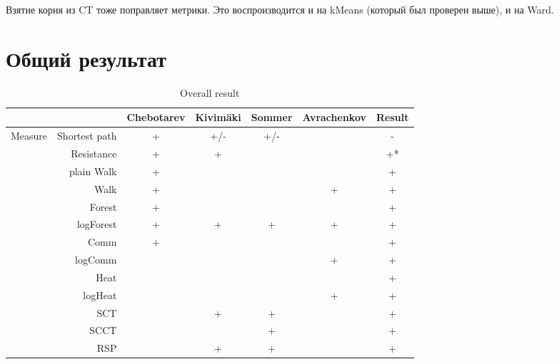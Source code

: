 \documentclass{article}
\begin{document}
Взятие корня из CT тоже поправляет метрики. Это воспроизводится и на kMeans (который был проверен выше), и на Ward.


\section*{Общий результат}

\begin{table}[H]
\centering
\caption{Overall result}
\label{my-label}
\begin{tabular}{rr|cccc|c}
                &                          & Chebotarev & Kivim{\"a}ki & Sommer & Avrachenkov & Result \\
                \hline
\multirow{18}{*}{Measure} & Shortest path  & +          & \cellcolor{red!25} +/- & \cellcolor{red!25} +/- & & \cellcolor{red!25} - \\
                & Resistance               & +          & +        &        &             &  \cellcolor{yellow!25} +* \\
                & plain Walk               & +          &          &        &             & +      \\
                & Walk                     & +          &          &        & +           & +      \\
                & Forest                   & +          &          &        &             & +      \\
                & logForest                & +          & +        & +      & +           & +      \\
                & Comm                     & +          &          &        &             & +      \\
                & logComm                  &            &          &        & +           & +      \\
                & Heat                     &            &          &        &             & \cellcolor{yellow!25} + \\
                & logHeat                  &            &          &        & +           & +      \\
                & SCT                      &            & +        & +      &             & +      \\
                & SCCT                     &            &          & +      &             & +      \\
                & RSP                      &            & +        & +      &             & +      \\

\end{tabular}
\end{table}
\end{document}
